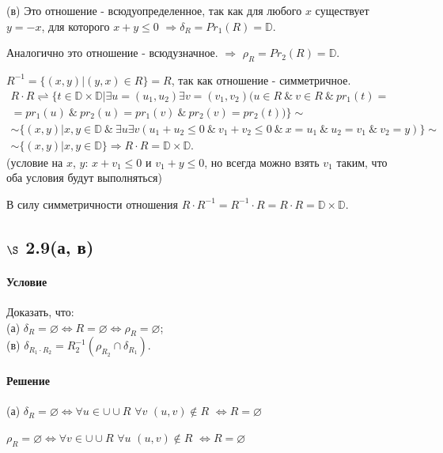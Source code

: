 \documentclass[a4paper,12pt]{article}
\begin{document}
\bigskip

(в) Это отношение - всюдуопределенное, так как для любого $x$ существует $y=-x$, для которого $x+y\leqslant 0$ $\Rightarrow \delta_R = Pr_1(R) = \mathbb{D}$.\par
Аналогично это отношение - всюдузначное. $\Rightarrow$ $\rho_R=Pr_2(R)=\mathbb{D}$.\par
$R^{-1} = \{(x,y)|(y,x)\in R\} = R$, так как отношение - симметричное.
\begin{gather*}
R\cdot R \rightleftharpoons \{t\in \mathbb{D}\times \mathbb{D} | \exists u=(u_1,u_2) \exists v=(v_1,v_2) (u\in R\  \& \ v\in R \ \& \ pr_1(t)=\\
= pr_1(u) \ \& \ pr_2(u)=pr_1(v) \ \& \ pr_2(v)=pr_2(t))\}\sim\\
\sim \{(x,y)|x,y\in \mathbb{D} \ \& \ \exists u \exists v (u_1+u_2\leqslant 0\ \& \ v_1+v_2\leqslant 0 \ \& \ x=u_1 \ \& \ u_2 = v_1 \ \& \ v_2 = y)\} \sim \\
\sim \{(x,y)|x,y\in \mathbb{D}\} \Rightarrow R\cdot R = \mathbb{D}\times \mathbb{D}.
\end{gather*}
(условие на $x$, $y$: $x+v_1\leqslant 0$ и $v_1+y\leqslant 0$, но всегда можно взять $v_1$ таким, что оба условия будут выполняться)\par
В силу симметричности отношения $R\cdot R^{-1} = R^{-1}\cdot R = R\cdot R = \mathbb{D}\times \mathbb{D}$.


\subsection*{$\S$ 2.9(а, в)}
\paragraph*{Условие}
Доказать, что:\\
(а) $\delta_R = \varnothing \Leftrightarrow R=\varnothing \Leftrightarrow \rho_R=\varnothing$;\\
(в) $\delta_{R_1\cdot R_2} = R_2^{-1} (\rho_{R_2} \cap \delta_{R_1})$.
\paragraph*{Решение}
(а) $\delta_R = \varnothing \Leftrightarrow \forall u \in  \cup \cup R$ $\forall v$ $(u,v)\notin R$ $\Leftrightarrow R=\varnothing$\par
$\rho_R = \varnothing \Leftrightarrow \forall v \in \cup \cup R$ $\forall u$ $(u,v)\notin R$ $\Leftrightarrow R=\varnothing$\par
\end{document}
